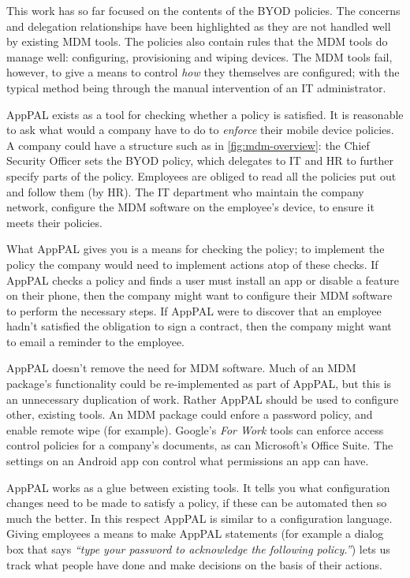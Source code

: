 \documentclass[thesis.tex]{subfiles}
\begin{document}
This work has so far focused on the contents of the BYOD policies.  The concerns
and delegation relationships have been highlighted as they are not handled well
by existing \ac{MDM} tools.  The policies also contain rules that the \ac{MDM}
tools do manage well: configuring, provisioning and wiping devices.  The
\ac{MDM} tools fail, however, to give a means to control \emph{how} they
themselves are configured; with the typical method being through the manual
intervention of an IT administrator.

AppPAL exists as a tool for checking whether a policy is satisfied.  It is
reasonable to ask what would a company have to do to \emph{enforce} their mobile
device policies. A company could have a structure such as in
\autoref{fig:mdm-overview}: the Chief Security Officer sets the BYOD policy,
which delegates to IT and HR to further specify parts of the policy.  Employees
are obliged to read all the policies put out and follow them (by HR).  The IT
department who maintain the company network, configure the \ac{MDM} software on
the employee's device, to ensure it meets their policies.

What AppPAL gives you is a means for checking the policy; to implement the
policy the company would need to implement actions atop of these checks.  If
AppPAL checks a policy and finds a user must install an app or disable a feature
on their phone, then the company might want to configure their \ac{MDM} software
to perform the necessary steps.  If AppPAL were to discover that an employee
hadn't satisfied the obligation to sign a contract, then the company might want
to email a reminder to the employee.

AppPAL doesn't remove the need for \ac{MDM} software.  Much of an \ac{MDM} package's functionality could be
re-implemented as part of AppPAL, but this is an unnecessary duplication of work.
Rather AppPAL should be used to configure other, existing tools.  An \ac{MDM} package could enfore a password policy, and enable remote wipe (for example).
Google's \emph{For Work} tools can enforce access control policies for a company's documents, as can Microsoft's Office Suite.
The settings on an Android app con control what permissions an app can have.

AppPAL works as a glue between existing tools.  It tells you
what configuration changes need to be made to satisfy a policy, if these can be
automated then so much the better.  In this respect AppPAL is similar to a
configuration language.  Giving employees a means to
make AppPAL statements (for example a dialog box that says \emph{``type your password to
acknowledge the following policy.''}) lets us track what people have done and
make decisions on the basis of their actions.  

%  
\end{document}
